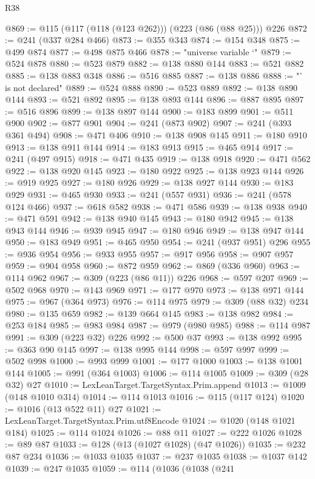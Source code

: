 \begin{lexlean}{R38}
\begin{coremodule}
@869 := @115 (@117 (@118 (@123 @262))) (@223 (@86 (@88 @25))) @226
@872 := @241 (@337 @284 @466)
@873 := @355 @343
@874 := @154 @348
@875 := @499 @874
@877 := @498 @875 @466
@878 := "universe variable `"
@879 := @524 @878
@880 := @523 @879
@882 := @138 @880 @144
@883 := @521 @882
@885 := @138 @883 @348
@886 := @516 @885
@887 := @138 @886
@888 := "` is not declared"
@889 := @524 @888
@890 := @523 @889
@892 := @138 @890 @144
@893 := @521 @892
@895 := @138 @893 @144
@896 := @887 @895
@897 := @516 @896
@899 := @138 @897 @144
@900 := @183 @899
@901 := @511 @900
@902 := @877 @901
@904 := @241 (@873 @902)
@907 := @241 (@393 @361 @494)
@908 := @471 @406
@910 := @138 @908 @145
@911 := @180 @910
@913 := @138 @911 @144
@914 := @183 @913
@915 := @465 @914
@917 := @241 (@497 @915)
@918 := @471 @435
@919 := @138 @918
@920 := @471 @562
@922 := @138 @920 @145
@923 := @180 @922
@925 := @138 @923 @144
@926 := @919 @925
@927 := @180 @926
@929 := @138 @927 @144
@930 := @183 @929
@931 := @465 @930
@933 := @241 (@557 @931)
@936 := @241 (@578 @124 @466)
@937 := @618 @582
@938 := @471 @586
@939 := @138 @938
@940 := @471 @591
@942 := @138 @940 @145
@943 := @180 @942
@945 := @138 @943 @144
@946 := @939 @945
@947 := @180 @946
@949 := @138 @947 @144
@950 := @183 @949
@951 := @465 @950
@954 := @241 (@937 @951) @296
@955 := @936 @954
@956 := @933 @955
@957 := @917 @956
@958 := @907 @957
@959 := @904 @958
@960 := @872 @959
@962 := @869 (@336 @960)
@963 := @114 @962
@967 := @309 (@223 (@86 @11)) @226
@968 := @597 @207
@969 := @502 @968
@970 := @143 @969
@971 := @177 @970
@973 := @138 @971 @144
@975 := @967 (@364 @973)
@976 := @114 @975
@979 := @309 (@88 @32) @234
@980 := @135 @659
@982 := @139 @664 @145
@983 := @138 @982
@984 := @253 @184
@985 := @983 @984
@987 := @979 (@980 @985)
@988 := @114 @987
@991 := @309 (@223 @32) @226
@992 := @500 @37
@993 := @138 @992
@995 := @363 @90 @145
@997 := @138 @995 @144
@998 := @597 @997
@999 := @502 @998
@1000 := @993 @999
@1001 := @177 @1000
@1003 := @138 @1001 @144
@1005 := @991 (@364 @1003)
@1006 := @114 @1005
@1009 := @309 (@28 @32) @27
@1010 := LexLeanTarget.TargetSyntax.Prim.append
@1013 := @1009 (@148 @1010 @314)
@1014 := @114 @1013
@1016 := @115 (@117 @124)
@1020 := @1016 (@13 @522 @11) @27
@1021 := LexLeanTarget.TargetSyntax.Prim.utf8Encode
@1024 := @1020 (@148 @1021 @184)
@1025 := @114 @1024
@1026 := @88 @11
@1027 := @222 @1026
@1028 := @89 @87
@1033 := @128 (@13 (@1027 @1028) (@47 @1026))
@1035 := @232 @87 @234
@1036 := @1033 @1035
@1037 := @237 @1035
@1038 := @1037 @142
@1039 := @247 @1035
@1059 := @114
    (@1036
      (@1038
        (@241

\end{coremodule}
\end{lexlean}
